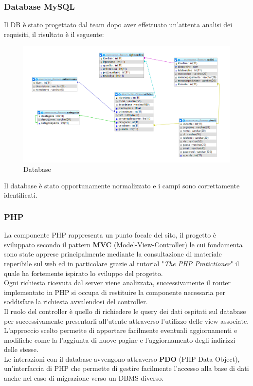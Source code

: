 \subsubsection{Database MySQL}
Il DB è stato progettato dal team dopo aver effettuato un'attenta analisi dei requisiti, il risultato è il seguente:
\begin{figure}[H]
	\includegraphics[width=\linewidth]{res/img/DB}
	\caption{Database}
	\label{Database Walk And Buy}
\end{figure}
Il database è stato opportunamente normalizzato e i campi sono correttamente identificati.

\subsubsection{PHP}
La componente PHP rappresenta un punto focale del sito, il progetto è sviluppato secondo il pattern \textbf{MVC} (Model-View-Controller) le cui fondamenta sono state apprese principalmente mediante la consultazione di materiale reperibile sul web ed in particolare grazie al tutorial "\textit{The PHP Pratictioner}" il quale ha fortemente ispirato lo sviluppo del progetto.\\
Ogni richiesta ricevuta dal server viene analizzata, successivamente il router implementato in PHP si occupa di restituire la componente necessaria per soddisfare la richiesta avvalendosi del controller.\\
Il ruolo del controller è quello di richiedere le query dei dati ospitati sul database per successivamente presentarli all’utente attraverso l’utilizzo delle view associate.\\
L’approccio scelto permette di apportare facilmente eventuali aggiornamenti e modifiche come la l’aggiunta di nuove pagine e l’aggiornamento degli indirizzi delle stesse. \\
Le interazioni con il database avvengono attraverso \textbf{PDO} (PHP Data Object), un’interfaccia di PHP che permette di gestire facilmente l’accesso alla base di dati anche nel caso di migrazione verso un DBMS diverso.\\

